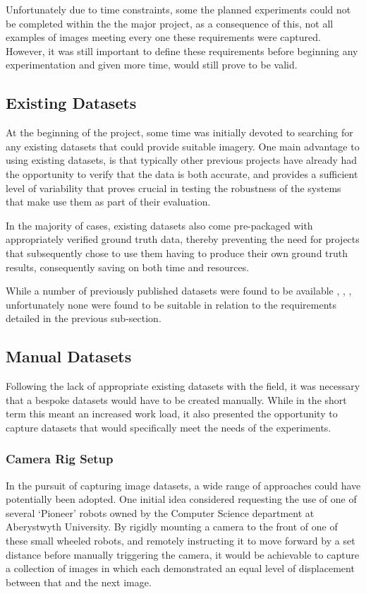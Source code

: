 Unfortunately due to time constraints, some the planned experiments could not be completed within the the major project, as a consequence of this, not all examples of images meeting every one these requirements were captured. However, it was still important to define these requirements before beginning any experimentation and given more time, would still prove to be valid.

\subsection{Existing Datasets}

At the beginning of the project, some time was initially devoted to searching for any existing datasets that could provide suitable imagery. One main advantage to using existing datasets, is that typically other previous projects have already had the opportunity to verify that the data is both accurate, and provides a sufficient level of variability that proves crucial in testing the robustness of the systems that make use them as part of their evaluation.

In the majority of cases, existing datasets also come pre-packaged with appropriately verified ground truth data, thereby preventing the need for projects that subsequently chose to use them having to produce their own ground truth results, consequently saving on both time and resources.

While a number of previously published datasets were found to be available \cite{ucl-dataset}, \cite{baker-dataset}, \cite{mpi-dataset}, unfortunately none were found to be suitable in relation to the requirements detailed in the previous sub-section.   

\subsection{Manual Datasets}

Following the lack of appropriate existing datasets with the field, it was necessary that a bespoke datasets would have to be created manually. While in the short term this meant an increased work load, it also presented the opportunity to capture datasets that would specifically meet the needs of the experiments.

\subsubsection{Camera Rig Setup}

In the pursuit of capturing image datasets, a wide range of approaches could have potentially been adopted. One initial idea considered requesting the use of one of several `Pioneer' robots owned by the Computer Science department at Aberystwyth University. By rigidly mounting a camera to the front of one of these small wheeled robots, and remotely instructing it to move forward by a set distance before manually triggering the camera, it would be achievable to capture a collection of images in which each demonstrated an equal level of displacement between that and the next image. 

